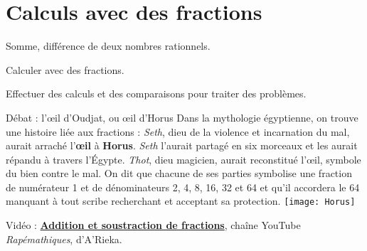 \graphicspath{{../../S22_Calculs_avec_des_fractions/Images/}}

\themeN
\chapter{Calculs avec des fractions}
\label{S22}

\programme%
   {\item Somme, différence de deux nombres rationnels.}
   {\item Calculer avec des fractions.
    \item Effectuer des calculs et des comparaisons pour traiter des problèmes.}

\vfill

\begin{debat}{Débat : l'\oe il d'Oudjat, ou \oe il d'Horus}
   Dans la mythologie égyptienne, on trouve une histoire liée aux fractions : {\it Seth}, dieu de la violence et incarnation du mal, aurait arraché l’{\bf œil} à {\bf Horus}. {\it Seth} l'aurait partagé en six morceaux et les aurait répandu à travers l’Égypte. {\it Thot}, dieu magicien, aurait reconstitué l’\oe il, symbole du bien contre le mal. On dit que chacune de ses parties symbolise une fraction de numérateur 1 et de dénominateurs 2, 4, 8, 16, 32 et 64 et qu'il accordera le 64 manquant à tout scribe recherchant et acceptant sa protection.
   \tcblower
      \texttt{[image: Horus]}
\end{debat}

\hfill {\gray Vidéo : \href{https://www.youtube.com/watch?v=TTLRP1Yd4Wk&embeds_referring_euri=https%3A%2F%2Fwww.arieka.fr%2F&source_ve_path=Mjg2NjY&feature=emb_logo}{\bf Addition et soustraction de fractions}, chaîne YouTube {\it Rapémathiques}, d'A'Rieka.}


